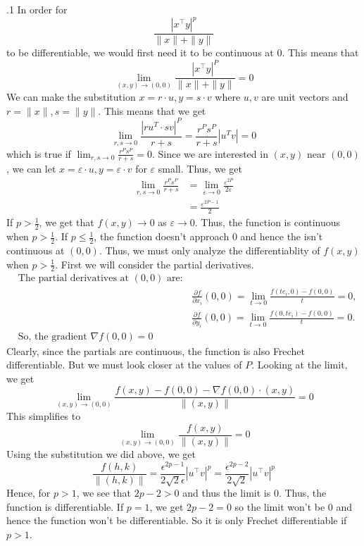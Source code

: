 \documentclass[12pt]{exam}
\begin{document}
\begin{questions}
.1 \newline
In order for \[\frac{|x^\top y|^p}{\|x\|+\|y\|}\] to be differentiable, we would first need it to be continuous at $0$. This means that \[\lim_{(x,y) \rightarrow (0,0)}\frac{|x^\top y|^P}{\|x\|+\|y\|}=0\] We can make the substitution $x = r\cdot u, y = s \cdot v$ where $u,v$ are unit vectors and $r = \|x\|, s = \|y\|$. This means that we get \[\lim_{r,s\to 0}\frac{|ru^{T}\cdot sv|^{P}}{r+s}=\frac{r^{P}s^{P}}{r+s}|u^{T}v|=0\] which is true if $\lim_{r,s \rightarrow 0}\frac{r^{P}s^{P}}{r+s} = 0$. Since we are interested in $(x,y)$ near $(0,0)$, we can let $x = \varepsilon\cdot u, y = \varepsilon \cdot v$ for $\varepsilon$ small. Thus, we get 
\begin{align*}
    \lim_{r,s \rightarrow 0}\frac{r^{P}s^{P}}{r+s} &=\lim_{\varepsilon \rightarrow 0}\frac{\varepsilon^{2P}}{2\varepsilon}\\
     &= \frac{\varepsilon^{2P-1}}{2}
\end{align*}
If $p>\frac{1}{2}$, we get that $f(x,y) \to 0$ as $\varepsilon \to 0$. Thus, the function is continuous when $p>\frac{1}{2}$. If $p\leq \frac{1}{2}$, the function doesn't approach $0$ and hence the isn't continuous at $(0,0)$. Thus, we must only analyze the differentiablity of $f(x,y)$ when $p > \frac{1}{2}$.\newline
First we will consider the partial derivatives. 
\[\begin{aligned}
&\text{The partial derivatives at }(0,0)\text{ are:} \\
&&&\frac{\partial f}{\partial x_i}(0,0)=\lim_{t\to0}\frac{f(te_i,0)-f(0,0)}t=0, \\
&&&\frac{\partial f}{\partial y_i}(0,0)=\lim_{t\to0}\frac{f(0,te_i)-f(0,0)}t=0. \\
&\text{So, the gradient }\nabla f(0,0)=0
\end{aligned}\]
Clearly, since the partials are continuous, the function is also Frechet differentiable. But we must look closer at the values of $P$. Looking at the limit, we get 
\[\lim_{(x,y)\to(0,0)}\frac{f(x,y)-f(0,0)-\nabla f(0,0)\cdot(x,y)}{\|(x,y)\|}=0\] This simplifies to \[\lim_{(x,y)\to(0,0)}\frac{f(x,y)}{\|(x,y)\|}=0\] Using the substitution we did above, we get \[\frac{f(h,k)}{\|(h,k)\|}=\frac{\epsilon^{2p-1}}{2\sqrt{2}\epsilon}|u^\top v|^p=\frac{\epsilon^{2p-2}}{2\sqrt{2}}|u^\top v|^p\] Hence, for $p > 1$, we see that $2p-2>0$ and thus the limit is $0$. Thus, the function is differentiable. If $p =1$, we get $2p-2=0$ so the limit won't be $0$ and hence the function won't be differentiable. So it is only Frechet differentiable if $p > 1$. 

\end{questions}
\end{document}
